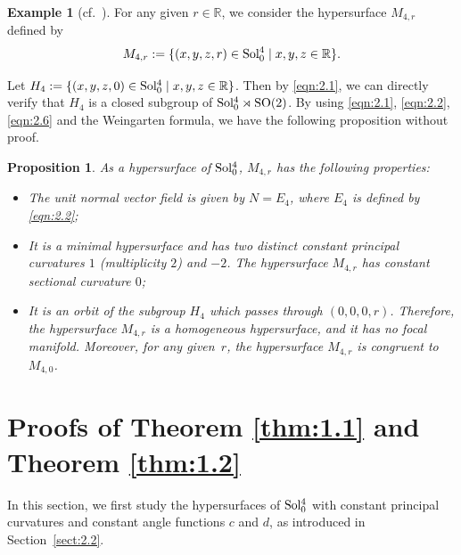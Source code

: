 \documentclass[reqno]{amsart}%
\newtheorem{proposition}[theorem]{Proposition}
\theoremstyle{definition}
\newtheorem{example}{Example}[section]  %
\numberwithin{equation}{section}
\begin{document}
	\begin{example}[cf.\ \cite{DIV,EI2}]\label{exam:3.3}
		For any given $r\in \mathbb{R}$, we consider the hypersurface $M_{4,r}$ defined by
		$$
		M_{4,r}:=\{(x,y,z,r)\in {\rm Sol_0^4}\mid x,y,z\in \mathbb{R}\}.
		$$
		
		Let $H_4:=\{(x,y,z,0)\in{\rm Sol_0^4}\mid x,y,z\in \mathbb{R}\}$.
		Then by \eqref{eqn:2.1}, we can directly verify that $H_4$ is a closed subgroup of ${\rm Sol_0^4 \rtimes SO(2)}$.
		By using \eqref{eqn:2.1}, \eqref{eqn:2.2}, \eqref{eqn:2.6} and the Weingarten formula,
		we have the following proposition without proof.
		\begin{proposition}\label{prop:M4r}
			As a hypersurface of ${\rm Sol_0^4}$,
			$M_{4,r}$ has the following properties:
			\begin{itemize}
				
				\vskip1mm
				\item[(1)]
				The unit normal vector field is given by $N=E_4$, where $E_4$ is defined by \eqref{eqn:2.2};
				
				\vskip1mm
				\item[(2)]
				It is a minimal hypersurface and has two distinct constant principal
				curvatures $1$ (multiplicity $2$) and $-2$. 
				The hypersurface $M_{4,r}$ has constant sectional curvature $0$;
				
				\vskip1mm
				\item[(3)]
				It is an orbit of the subgroup $H_4$ which passes through
				$(0,0,0,r)$. Therefore, the hypersurface $M_{4,r}$ is a homogeneous hypersurface,
				and it has no focal manifold. Moreover, for any given~$r$,
				the hypersurface $M_{4,r}$ is congruent to $M_{4,0}$.
			\end{itemize}
		\end{proposition}
	\end{example}
	
	\section{Proofs of Theorem \texorpdfstring{\ref{thm:1.1}}{1.1} and Theorem \texorpdfstring{\ref{thm:1.2}}{1.2}}\label{sect:4}
	
	In this section, we first study the hypersurfaces of ${\rm Sol_0^4}$
	with constant principal curvatures and constant angle functions $c$ and $d$, as introduced in Section~\ref{sect:2.2}.
	
\end{document}
